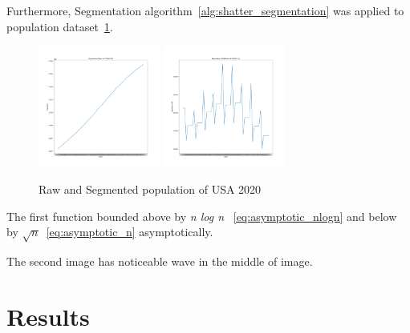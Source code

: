 Furthermore, Segmentation algorithm~\ref{alg:shatter_segmentation} was applied to population dataset~\ref{fig:raw_and_segmentated_population}.

\begin{figure}[h]
    \includegraphics*[width=4cm, height=4cm]{../src/output/population.png}
    \includegraphics*[width=4cm, height=4cm]{../src/output/population-diff.png}
    \caption{Raw and Segmented population of USA 2020}
    \label{fig:raw_and_segmentated_population}
\end{figure}

The first function bounded above by {\textit{n log n} }~\ref{eq:asymptotic_nlogn} and below by $\sqrt{n}$~\ref{eq:asymptotic_n} asymptotically.

The second image has noticeable wave in the middle of image.








\section{Results}
\label{sec:results}


